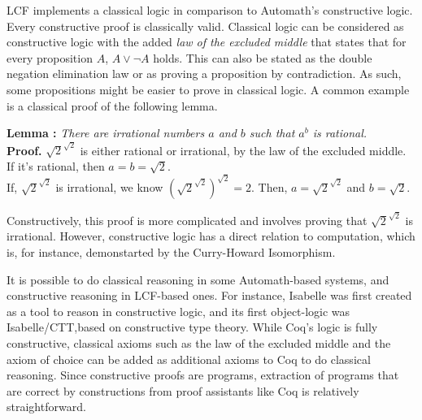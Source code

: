 \documentclass{article}
\begin{document}
	LCF implements a classical logic
	in comparison to Automath's 
	constructive logic. Every 
	constructive proof is classically 
	valid. Classical logic can 
	be considered as constructive 
	logic with the added 
	\textit{law of the excluded 
	middle} that states that for 
	every proposition $A$, 
	$A \lor \neg A$ holds. This can 
	also be stated as the 
	double negation elimination 
	law or as proving a 
	proposition by contradiction. As
	such, some propositions might be 
	easier to prove in classical 
	logic. A common example is a 
	classical proof of the 
	following lemma. 
	
	\textbf{Lemma : } \textit{There are 
	irrational numbers $a$ and $b$ 
	such that $a^b$ is rational.}\\
	\textbf{Proof. }
	$\sqrt{2}^{\sqrt{2}}$ is either 
	rational or irrational, by the 
	law of the excluded middle. \\
	If it's rational, then 
	$a = b = \sqrt{2}$. \\
	If, $\sqrt{2}^{\sqrt{2}}$ is 
	irrational, we know 
	$(\sqrt{2}^{\sqrt{2}})^{\sqrt{2}} = 
	2$. Then, $a = \sqrt{2}^{\sqrt{2}}$
	and $b = \sqrt{2}$.
	
	Constructively, this proof is 
	more complicated and involves 
	proving that $\sqrt{2}^{\sqrt{2}}$
	is irrational. However, 
	constructive logic has a direct 
	relation to computation, which 
	is, for instance, demonstarted 
	by the Curry-Howard Isomorphism.
	
	It is possible to do classical 
	reasoning in some Automath-based
	systems, and constructive reasoning 
	in LCF-based ones. For instance, 
	Isabelle was first created as 
	a tool to reason in constructive 
	logic, and its first object-logic
	was Isabelle/CTT,based on 
	constructive type theory. While
	Coq's logic is fully constructive,
	classical axioms such as the 
	law of the excluded middle and the 
	axiom of choice can be added as 
	additional axioms to Coq to do 
	classical reasoning. Since 
	constructive proofs are 
	programs, extraction of 
	programs that are correct
	by constructions from proof 
	assistants like Coq is relatively 
	straightforward.
	
\end{document}

